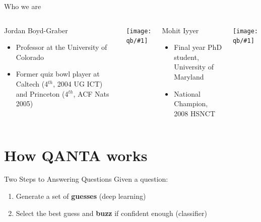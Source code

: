 \documentclass[compress]{beamer}
\newcommand{\gfxq}[2]{
\begin{center}
	\texttt{[image: qb/\#1]}
\end{center}
}
\begin{document}
\begin{frame}{Who we are}

	\begin{columns}
			\begin{block}{Jordan Boyd-Graber}
			
			\begin{itemize}
				\item Professor at the University of Colorado
				\item Former quiz bowl player at Caltech (4$^{th}$, 2004 UG ICT) and Princeton (4$^{th}$, ACF Nats 2005)
			\end{itemize}
			
			\end{block}
			\gfxq{jordan_qb}{.5}
		
		
			\begin{block}{Mohit Iyyer}
			
			\begin{itemize}
				\item Final year PhD student, University of Maryland
				\item National Champion, 2008 HSNCT
			\end{itemize}
			
			\end{block}
			\gfxq{mohit_qb}{.5}	
	\end{columns}

\end{frame}

\section{How QANTA works}

\begin{frame}{Two Steps to Answering Questions}
	Given a question:
	\begin{enumerate}
		\item Generate a set of {\bf guesses} (deep learning)
		\item Select the best guess and {\bf buzz} if confident enough (classifier)
	\end{enumerate}
\end{frame}
\end{document}
